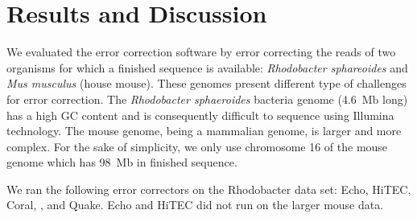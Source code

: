 \documentclass[10pt]{bmc_article}
\newenvironment{bmcformat}{\fussy\setboolean{publ}{true}}{\fussy}
\begin{document}
\begin{bmcformat}


 
\section*{Results and Discussion}

We evaluated the error correction software by error correcting the reads of two organisms for which a finished sequence is available: \emph{Rhodobacter sphareoides} and \emph{Mus musculus} (house mouse).
These genomes present different type of challenges for error correction.
The \emph{Rhodobacter sphaeroides} bacteria genome (\SI{4.6}{Mb} long) has a high GC content and is consequently difficult to sequence using Illumina technology.
The mouse genome, being a mammalian genome, is larger and more complex.
For the sake of simplicity, we only use chromosome 16 of the mouse genome which has \SI{98}{Mb} in finished sequence.

We ran the following error correctors on the Rhodobacter data set: Echo, HiTEC, Coral, \quorum, and Quake.
Echo and HiTEC did not run on the larger mouse data.


\end{bmcformat}
\end{document}
